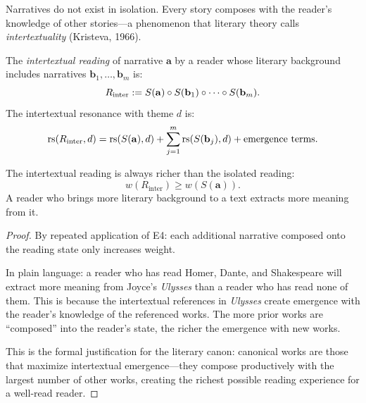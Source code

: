 Narratives do not exist in isolation.  Every story composes with the reader's
knowledge of other stories---a phenomenon that literary theory calls
\emph{intertextuality} (Kristeva, 1966).

\begin{definition}
\label{def:intertextuality}
The \emph{intertextual reading} of narrative $\mathbf{a}$ by a reader whose
literary background includes narratives $\mathbf{b}_1, \ldots, \mathbf{b}_m$
is:
\[
  R_{\text{inter}} := S(\mathbf{a}) \circ S(\mathbf{b}_1) \circ
  \cdots \circ S(\mathbf{b}_m).
\]
The intertextual resonance with theme $d$ is:
\[
  \mathrm{rs}(R_{\text{inter}}, d) = \mathrm{rs}(S(\mathbf{a}), d) +
  \sum_{j=1}^{m} \mathrm{rs}(S(\mathbf{b}_j), d) +
  \text{emergence terms}.
\]
\end{definition}

\begin{theorem}
\label{thm:intertextual-enrichment}
The intertextual reading is always richer than the isolated reading:
\[
  w(R_{\text{inter}}) \geq w(S(\mathbf{a})).
\]
A reader who brings more literary background to a text extracts more meaning
from it.
\end{theorem}

\begin{proof}
By repeated application of E4: each additional narrative composed onto the
reading state only increases weight.

In plain language: a reader who has read Homer, Dante, and Shakespeare
will extract more meaning from Joyce's \emph{Ulysses} than a reader who
has read none of them.  This is because the intertextual references in
\emph{Ulysses} create emergence with the reader's knowledge of the
referenced works.  The more prior works are ``composed'' into the reader's
state, the richer the emergence with new works.

This is the formal justification for the literary canon: canonical works are
those that maximize intertextual emergence---they compose productively with
the largest number of other works, creating the richest possible reading
experience for a well-read reader.
\end{proof}

